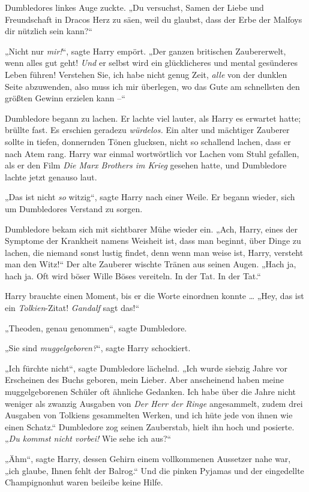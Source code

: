 {Dumbledores linkes Auge zuckte. „Du versuchst, Samen der Liebe und Freundschaft in Dracos Herz zu säen, weil du glaubst, dass der Erbe der Malfoys dir nützlich sein kann?“

„Nicht nur \emph{mir!}“, sagte Harry empört. „Der ganzen britischen Zaubererwelt, wenn alles gut geht! \emph{Und} er selbst wird ein glücklicheres und mental gesünderes Leben führen! Verstehen Sie, ich habe nicht genug Zeit, \emph{alle} von der dunklen Seite abzuwenden, also muss ich mir überlegen, wo das Gute am schnellsten den größten Gewinn erzielen kann --“

Dumbledore begann zu lachen. Er lachte viel lauter, als Harry es erwartet hatte; brüllte fast. Es erschien geradezu \emph{würdelos.} Ein alter und mächtiger Zauberer sollte in tiefen, donnernden Tönen glucksen, nicht so schallend lachen, dass er nach Atem rang. Harry war einmal wortwörtlich vor Lachen vom Stuhl gefallen, als er den Film \emph{Die Marx Brothers im Krieg} gesehen hatte, und Dumbledore lachte jetzt genauso laut.

„Das ist nicht \emph{so} witzig“, sagte Harry nach einer Weile. Er begann wieder, sich um Dumbledores Verstand zu sorgen.

Dumbledore bekam sich mit sichtbarer Mühe wieder ein. „Ach, Harry, eines der Symptome der Krankheit namens Weisheit ist, dass man beginnt, über Dinge zu lachen, die niemand sonst lustig findet, denn wenn man weise ist, Harry, versteht man den Witz!“ Der alte Zauberer wischte Tränen aus seinen Augen. „Hach ja, hach ja. Oft wird böser Wille Böses vereiteln. In der Tat. In der Tat.“

Harry brauchte einen Moment, bis er die Worte einordnen konnte … „Hey, das ist ein \emph{Tolkien}-Zitat! \emph{Gandalf} sagt das!“

„Theoden, genau genommen“, sagte Dumbledore.

„Sie sind \emph{muggelgeboren?}“, sagte Harry schockiert.

„Ich fürchte nicht“, sagte Dumbledore lächelnd. „Ich wurde siebzig Jahre vor Erscheinen des Buchs geboren, mein Lieber. Aber anscheinend haben meine muggelgeborenen Schüler oft ähnliche Gedanken. Ich habe über die Jahre nicht weniger als zwanzig Ausgaben von \emph{Der Herr der Ringe} angesammelt, zudem drei Ausgaben von Tolkiens gesammelten Werken, und ich hüte jede von ihnen wie einen Schatz.“ Dumbledore zog seinen Zauberstab, hielt ihn hoch und posierte. „\emph{Du kommst nicht vorbei!} Wie sehe ich aus?“

„Ähm“, sagte Harry, dessen Gehirn einem vollkommenen Aussetzer nahe war, „ich glaube, Ihnen fehlt der Balrog.“ Und die pinken Pyjamas und der eingedellte Champignonhut waren beileibe keine Hilfe.

}
